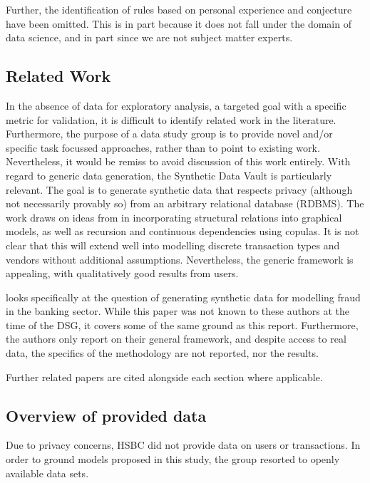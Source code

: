 \documentclass[]{article}
\begin{document}
Further, the identification of rules based on personal experience and
conjecture have been omitted. This is in part because it does not fall
under the domain of data science, and in part since we are not subject
matter experts.

\subsection{Related Work}\label{related-work}

In the absence of data for exploratory analysis, a targeted goal with a specific
metric for validation, it is difficult to identify related work
in the literature. Furthermore, the purpose of a data study group is to
provide novel and/or specific task focussed approaches, rather than to
point to existing work. Nevertheless, it would be remiss to avoid
discussion of this work entirely. With regard to generic data
generation, the Synthetic Data Vault \citep{patki2016synthetic} is particularly
relevant. The goal is to generate synthetic data that respects privacy
(although not necessarily provably so) from an arbitrary relational
database (RDBMS). The work draws on ideas from \citep{friedman1999learning} in incorporating structural
relations into graphical models, as well as recursion and continuous
dependencies using copulas. It is not clear that this will extend well
into modelling discrete transaction types and vendors without additional
assumptions. Nevertheless, the generic framework is appealing, with
qualitatively good results from users.

\citep{lundin2002synthetic}
looks specifically at the question of generating synthetic data for
modelling fraud in the banking sector. While this paper was not known to
these authors at the time of the DSG, it covers some of the same ground
as this report. Furthermore, the authors only report on their general
framework, and despite access to real data, the specifics of the
methodology are not reported, nor the results.

Further related papers are cited alongside each section where
applicable.

\subsection{Overview of provided
data}\label{overview-of-provided-data}

Due to privacy concerns, HSBC did not provide data on users or
transactions. In order to ground models proposed in this study, the
group resorted to openly available data sets.
\end{document}
